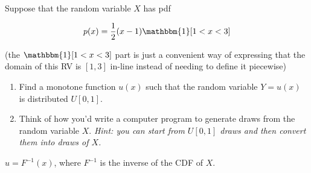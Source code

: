 \documentclass{article}
\newenvironment{solution}{\color{red}}{\color{black}}
\begin{document}
Suppose that the random variable $X$ has pdf

\[ p(x) = \frac12 (x - 1) \mathbbm{1}[1 < x < 3] \]

(the $\mathbbm{1}[1 < x < 3]$ part is just a convenient way of expressing that the domain of this RV is $[1, 3]$ in-line instead of needing to define it piecewise)

\begin{enumerate}
\item Find a monotone function $u(x)$ such that the random variable $Y = u(x)$ is distributed $U[0,1]$.
\item Think of how you'd write a computer program to generate draws from the random variable $X$. \textit{Hint: you can start from $U[0, 1]$ draws and then convert them into draws of $X$.} 
\end{enumerate}

\begin{solution}
$u = F^{-1}(x)$, where $F^{-1}$ is the inverse of the CDF of $X$. 
\end{solution}
\end{document}
